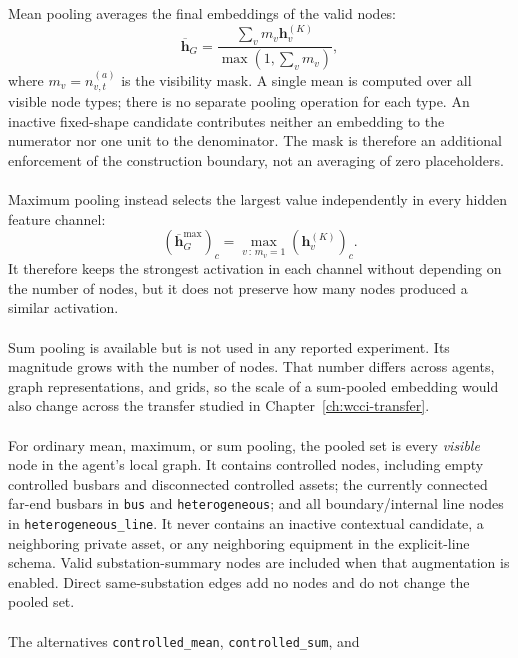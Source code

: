 Mean pooling averages the final embeddings of the valid nodes:
\begin{equation}
  \overline{\mathbf{h}}_G =
  \frac{\sum_v m_v\mathbf{h}^{(K)}_v}
       {\max(1,\sum_v m_v)},
  \label{eq:methods-mean-pooling}
\end{equation}
where $m_v=n^{(a)}_{v,t}$ is the visibility mask. A single mean is computed over
all visible node types; there is no separate pooling operation for each type.
An inactive fixed-shape candidate contributes neither an embedding to the
numerator nor one unit to the denominator. The mask is therefore an additional
enforcement of the construction boundary, not an averaging of zero
placeholders.
\\
\\
Maximum pooling instead selects the largest value independently in every hidden
feature channel:
\begin{equation}
  \left(\overline{\mathbf{h}}^{\max}_G\right)_c =
  \max_{v\,:\,m_v=1}\left(\mathbf{h}^{(K)}_v\right)_c.
  \label{eq:methods-max-pooling}
\end{equation}
It therefore keeps the strongest activation in each channel without depending
on the number of nodes, but it does not preserve how many nodes produced a
similar activation.
\\
\\
Sum pooling is available but is not used in any reported experiment. Its
magnitude grows with the number of nodes. That number differs across agents,
graph representations, and grids, so the scale of a sum-pooled embedding would
also change across the transfer studied in Chapter~\ref{ch:wcci-transfer}.
\\
\\
For ordinary mean, maximum, or sum pooling, the pooled set is every
\emph{visible} node in the agent's local graph. It contains controlled nodes,
including empty controlled busbars and disconnected controlled assets; the
currently connected far-end busbars in \texttt{bus} and
\texttt{heterogeneous}; and all boundary/internal line nodes in
\texttt{heterogeneous\_line}. It never contains an inactive contextual
candidate, a neighboring private asset, or any neighboring equipment in the
explicit-line schema. Valid substation-summary nodes are included when that
augmentation is enabled. Direct same-substation edges add no nodes and do not
change the pooled set.
\\
\\
The alternatives \texttt{controlled\_mean}, \texttt{controlled\_sum}, and
